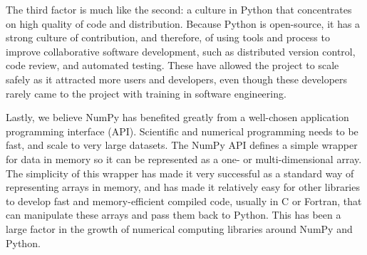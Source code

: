 The third factor is much like the second: a culture in Python that concentrates
on high quality of code and distribution. Because Python is open-source, it has
a strong culture of contribution, and therefore, of using tools and process to
improve collaborative software development, such as distributed version
control, code review, and automated testing.  These have allowed the project to
scale safely as it attracted more users and developers, even though these
developers rarely came to the project with training in software engineering.

Lastly, we believe NumPy has benefited greatly from a well-chosen application
programming interface (API).  Scientific and numerical programming needs to be
fast, and scale to very large datasets.  The NumPy API defines a simple wrapper
for data in memory so it can be represented as a one- or multi-dimensional
array.  The simplicity of this wrapper has made it very successful as a
standard way of representing arrays in memory, and has made it relatively easy
for other libraries to develop fast and memory-efficient compiled code, usually
in C or Fortran, that can manipulate these arrays and pass them back to Python.
This has been a large factor in the growth of numerical computing libraries
around NumPy and Python.


%
%
%
%
%
%

